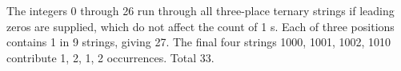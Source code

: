 The integers 0 through 26 run through all three-place ternary strings if leading zeros are supplied, which do not affect the count of 1 s. Each of three positions contains 1 in 9 strings, giving 27. The final four strings 1000, 1001, 1002, 1010 contribute 1, 2, 1, 2 occurrences. Total $\boxed{33}$.
